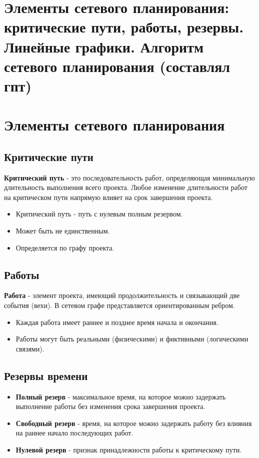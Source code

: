 {
	\section{Элементы сетевого планирования: критические пути, работы, резервы. Линейные
графики. Алгоритм сетевого планирования (составлял гпт)}

\section*{Элементы сетевого планирования}

\subsection*{Критические пути}

\textbf{Критический путь} - это последовательность работ, определяющая минимальную длительность выполнения всего проекта.  
Любое изменение длительности работ на критическом пути напрямую влияет на срок завершения проекта.

\begin{itemize}
  \item Критический путь - путь с нулевым полным резервом.
  \item Может быть не единственным.
  \item Определяется по графу проекта.
\end{itemize}

\subsection*{Работы}

\textbf{Работа} - элемент проекта, имеющий продолжительность и связывающий две события (вехи).  
В сетевом графе представляется ориентированным ребром.

\begin{itemize}
  \item Каждая работа имеет раннее и позднее время начала и окончания.
  \item Работы могут быть реальными (физическими) и фиктивными (логическими связями).
\end{itemize}

\subsection*{Резервы времени}

\begin{itemize}
  \item \textbf{Полный резерв} - максимальное время, на которое можно задержать выполнение работы без изменения срока завершения проекта.
  \item \textbf{Свободный резерв} - время, на которое можно задержать работу без влияния на раннее начало последующих работ.
  \item \textbf{Нулевой резерв} - признак принадлежности работы к критическому пути.
\end{itemize}

}
